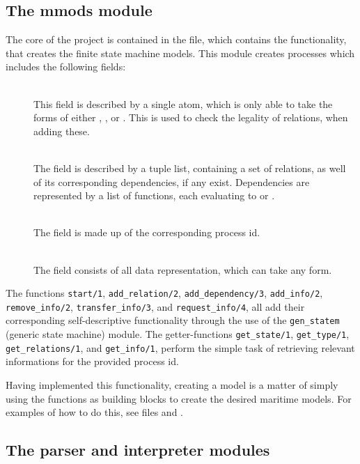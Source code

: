 \subsection{The mmods module}
The core of the project is contained in the  file, which contains the functionality, that creates the finite state machine models. This module creates processes which includes the following fields:
\begin{description}
	\item[]\ \\
		This field is described by a single atom, which is only able to take the forms of either , , or . This is used to check the legality of relations, when adding these.
	\item[]\ \\
		The  field is described by a tuple list, containing a set of relations, as well of its corresponding dependencies, if any exist. Dependencies are represented by a list of functions, each evaluating to  or .
	\item[]\ \\
		The  field is made up of the corresponding process id.
	\item[]\ \\
		The  field consists of all data representation, which can take any form.
\end{description}
The functions \lstinline{start/1}, \lstinline{add_relation/2}, \lstinline{add_dependency/3}, \lstinline{add_info/2}, \linebreak \lstinline{remove_info/2}, \lstinline{transfer_info/3}, and \lstinline{request_info/4}, all add their corresponding self-descriptive functionality through the use of the \lstinline{gen_statem} (generic state machine) module. The getter-functions \lstinline{get_state/1}, \lstinline{get_type/1}, \lstinline{get_relations/1}, and \lstinline{get_info/1}, perform the simple task of retrieving relevant informations for the provided process id.

Having implemented this functionality, creating a model is a matter of simply using the functions as building blocks to create the desired maritime models. For examples of how to do this, see files  and .

\subsection{The parser and interpreter modules}


